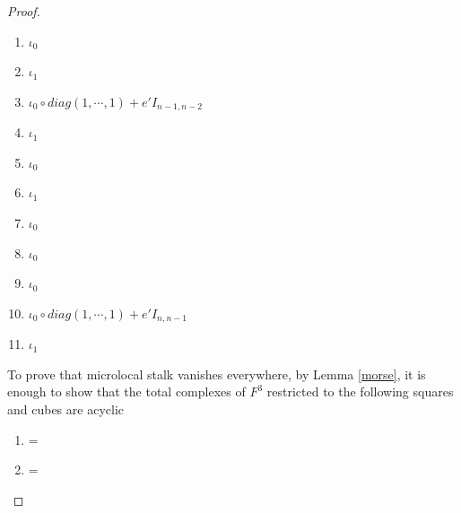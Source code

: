\begin{proof}
\begin{enumerate}[label = (\arabic*)]
\item $\iota_0$

\item $\iota_1$

\item $\iota_0 \circ diag(1,\cdots,1) + e'I_{n-1,n-2}$

\item $\iota_1$

\item $\iota_0$

\item $\iota_1$

\item $\iota_0$

\item $\iota_0$

\item $\iota_0$

\item $\iota_0 \circ diag(1,\cdots,1)+e'I_{n,n-1}$

\item $\iota_1$
\end{enumerate}
To prove that microlocal stalk vanishes everywhere, by Lemma \ref{morse}, it is enough to show that the total complexes of $F^3$ restricted to the following squares and cubes are acyclic

\begin{enumerate}[label = (\roman*)]
\item 
{}
=


\item 
{}
=


\end{enumerate}
\end{proof}
